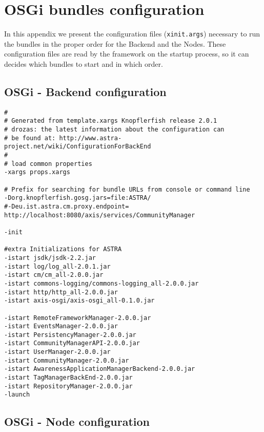 \chapter{OSGi bundles configuration}
\label{appendix:osgi-bundles-config}


In this appendix we present the configuration files (\verb|xinit.args|)
necessary to run the bundles in the proper order for the Backend and the Nodes.
These configuration files are read by the framework on the startup process, so
it can decides which bundles to start and in which order.

\section{OSGi - Backend configuration}

\begin{verbatim}
#
# Generated from template.xargs Knopflerfish release 2.0.1
# drozas: the latest information about the configuration can
# be found at: http://www.astra-project.net/wiki/ConfigurationForBackEnd
#
# load common properties
-xargs props.xargs

# Prefix for searching for bundle URLs from console or command line
-Dorg.knopflerfish.gosg.jars=file:ASTRA/
#-Deu.ist.astra.cm.proxy.endpoint=
http://localhost:8080/axis/services/CommunityManager

-init

#extra Initializations for ASTRA
-istart jsdk/jsdk-2.2.jar
-istart log/log_all-2.0.1.jar
-istart cm/cm_all-2.0.0.jar
-istart commons-logging/commons-logging_all-2.0.0.jar
-istart http/http_all-2.0.0.jar
-istart axis-osgi/axis-osgi_all-0.1.0.jar

-istart RemoteFrameworkManager-2.0.0.jar
-istart EventsManager-2.0.0.jar
-istart PersistencyManager-2.0.0.jar
-istart CommunityManagerAPI-2.0.0.jar
-istart UserManager-2.0.0.jar
-istart CommunityManager-2.0.0.jar
-istart AwarenessApplicationManagerBackend-2.0.0.jar
-istart TagManagerBackEnd-2.0.0.jar
-istart RepositoryManager-2.0.0.jar
-launch
\end{verbatim}

\section{OSGi - Node configuration}

